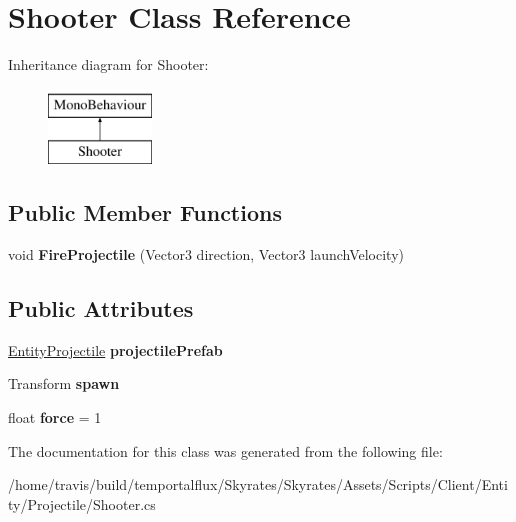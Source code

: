 \hypertarget{class_shooter}{\section{Shooter Class Reference}
\label{class_shooter}
}
Inheritance diagram for Shooter\-:\begin{figure}[H]
\begin{center}
\leavevmode
\includegraphics[height=2.000000cm]{class_shooter}
\end{center}
\end{figure}
\subsection*{Public Member Functions}
\begin{DoxyCompactItemize}
\item 
\hypertarget{class_shooter_a8f6d6c78a0579a73a8833a09b2302996}{void {\bfseries Fire\-Projectile} (Vector3 direction, Vector3 launch\-Velocity)}\label{class_shooter_a8f6d6c78a0579a73a8833a09b2302996}

\end{DoxyCompactItemize}
\subsection*{Public Attributes}
\begin{DoxyCompactItemize}
\item 
\hypertarget{class_shooter_a27ab3b5f1ad32aee861cdf4e5f2b7f3f}{\hyperlink{class_entity_projectile}{Entity\-Projectile} {\bfseries projectile\-Prefab}}\label{class_shooter_a27ab3b5f1ad32aee861cdf4e5f2b7f3f}

\item 
\hypertarget{class_shooter_a2ace09fc935b67cad5592a578516ec03}{Transform {\bfseries spawn}}\label{class_shooter_a2ace09fc935b67cad5592a578516ec03}

\item 
\hypertarget{class_shooter_ade2928b5b4ff8b037913d71f312cbc38}{float {\bfseries force} = 1}\label{class_shooter_ade2928b5b4ff8b037913d71f312cbc38}

\end{DoxyCompactItemize}


The documentation for this class was generated from the following file\-:\begin{DoxyCompactItemize}
\item 
/home/travis/build/temportalflux/\-Skyrates/\-Skyrates/\-Assets/\-Scripts/\-Client/\-Entity/\-Projectile/Shooter.\-cs\end{DoxyCompactItemize}
